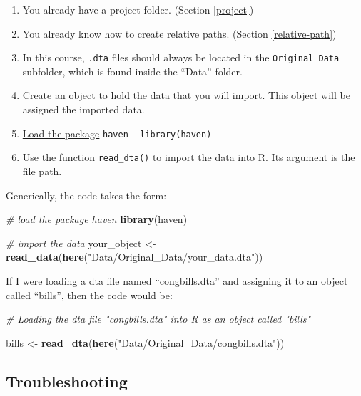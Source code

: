 \documentclass[
]{book}
\newenvironment{Shaded}{\begin{snugshade}}{\end{snugshade}}
\newcommand{\CommentTok}[1]{\textcolor[rgb]{0.56,0.35,0.01}{\textit{#1}}}
\newcommand{\FunctionTok}[1]{\textcolor[rgb]{0.13,0.29,0.53}{\textbf{#1}}}
\newcommand{\NormalTok}[1]{#1}
\newcommand{\OtherTok}[1]{\textcolor[rgb]{0.56,0.35,0.01}{#1}}
\newcommand{\StringTok}[1]{\textcolor[rgb]{0.31,0.60,0.02}{#1}}
\providecommand{\tightlist}{%
  \setlength{\itemsep}{0pt}\setlength{\parskip}{0pt}}
\begin{document}
\begin{enumerate}
\def\labelenumi{\arabic{enumi}.}
\tightlist
\item
  You already have a project folder. (Section \ref{project})
\item
  You already know how to create relative paths. (Section \ref{relative-path})
\item
  In this course, \texttt{.dta} files should always be located in the \texttt{Original\_Data} subfolder, which is found inside the ``Data'' folder.
\item
  \protect\hyperlink{object}{Create an object} to hold the data that you will import. This object will be assigned the imported data.
\item
  \protect\hyperlink{loadpack}{Load the package} \texttt{haven} -- \texttt{library(haven)}
\item
  Use the function \texttt{read\_dta()} to import the data into R. Its argument is the file path.
\end{enumerate}

Generically, the code takes the form:

\begin{Shaded}
\begin{Highlighting}[]
\CommentTok{\# load the package \textquotesingle{}haven\textquotesingle{}}
\FunctionTok{library}\NormalTok{(haven)}

\CommentTok{\# import the data}
\NormalTok{your\_object }\OtherTok{\textless{}{-}} \FunctionTok{read\_data}\NormalTok{(}\FunctionTok{here}\NormalTok{(}\StringTok{"Data/Original\_Data/your\_data.dta"}\NormalTok{))}
\end{Highlighting}
\end{Shaded}

If I were loading a dta file named ``congbills.dta'' and assigning it to an object called ``bills'', then the code would be:

\begin{Shaded}
\begin{Highlighting}[]
\CommentTok{\# Loading the dta file "congbills.dta" into R as an object called "bills"}

\NormalTok{bills }\OtherTok{\textless{}{-}} \FunctionTok{read\_dta}\NormalTok{(}\FunctionTok{here}\NormalTok{(}\StringTok{"Data/Original\_Data/congbills.dta"}\NormalTok{))}
\end{Highlighting}
\end{Shaded}

\hypertarget{troubleshooting-8}{%
\subsection{Troubleshooting}\label{troubleshooting-8}}
\end{document}
